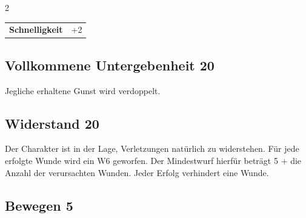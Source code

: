 \begin{multicols}{2}
\begin{tcolorbox}
\begin{tabular}{@{}ll@{}}
    \textbf{Schnelligkeit} & +2\\
\end{tabular}


\end{tcolorbox}

\begin{tcolorbox}
    \subsection*{Vollkommene Untergebenheit \hfill \small{20 }}
    \tcblower
Jegliche erhaltene Gunst wird verdoppelt.


\vspace{3mm}



\end{tcolorbox}

\begin{tcolorbox}
    \subsection*{Widerstand \hfill \small{20 }}
    \tcblower
Der Charakter ist in der Lage, Verletzungen natürlich zu widerstehen. Für jede erfolgte Wunde wird ein W6 geworfen. Der Mindestwurf hierfür beträgt 5 + die Anzahl der verursachten Wunden. Jeder Erfolg verhindert eine Wunde.


\vspace{3mm}



\end{tcolorbox}

\begin{tcolorbox}
    \subsection*{Bewegen \hfill \small{5 }}
    \tcblower





\end{tcolorbox}
\end{multicols}
